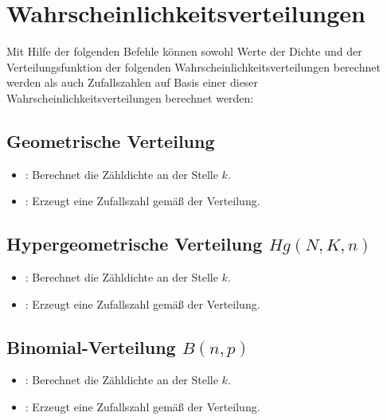 \chapter{Wahrscheinlichkeitsverteilungen}\label{sec:Wahrscheinlichkeitsverteilungen}

Mit Hilfe der folgenden Befehle können sowohl Werte der Dichte und der Verteilungsfunktion
der folgenden Wahrscheinlichkeitsverteilungen berechnet werden als auch Zufallszahlen
auf Basis einer dieser Wahrscheinlichkeitsverteilungen berechnet werden:



\section{Geometrische Verteilung}

\begin{itemize}

\item
{}:
Berechnet die Zähldichte an der Stelle $k$.


\item
{}:
Erzeugt eine Zufallszahl gemäß der Verteilung.

\end{itemize}



\section{Hypergeometrische Verteilung \texorpdfstring{$Hg(N,K,n)$}{Hg(N,K,n)}}

\begin{itemize}

\item
{}:
Berechnet die Zähldichte an der Stelle $k$.

\item
{}:
Erzeugt eine Zufallszahl gemäß der Verteilung.

\end{itemize}



\section{Binomial-Verteilung \texorpdfstring{$B(n,p)$}{B(n,p)}}

\begin{itemize}

\item
{}:
Berechnet die Zähldichte an der Stelle $k$.


\item
{}:
Erzeugt eine Zufallszahl gemäß der Verteilung.

\end{itemize}



